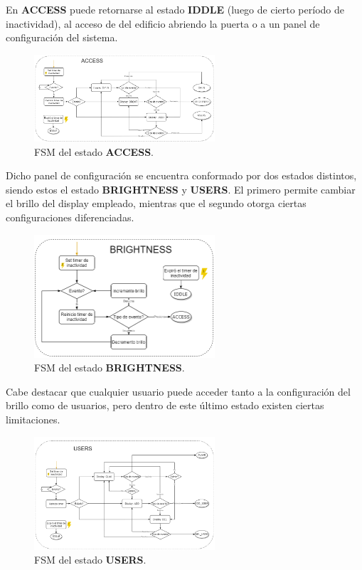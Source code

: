 En \textbf{ACCESS} puede retornarse al estado \textbf{IDDLE} (luego de cierto período de inactividad), al acceso de del edificio abriendo la puerta o a un panel de configuración del sistema.

\begin{figure}[H]
\centering
	\includegraphics[width=0.6\textwidth]{ImagenesEjercicio2/access.png}
	\caption{FSM del estado \textbf{ACCESS}.}
	\label{fig:access}
\end{figure}

Dicho panel de configuración se encuentra conformado por dos estados distintos, siendo estos el estado \textbf{BRIGHTNESS} y \textbf{USERS}. El primero permite cambiar el brillo del display empleado, mientras que el segundo otorga ciertas configuraciones diferenciadas.

\begin{figure}[H]
\centering
	\includegraphics[width=0.6\textwidth]{ImagenesEjercicio2/bright.png}
	\caption{FSM del estado \textbf{BRIGHTNESS}.}
	\label{fig:bright}
\end{figure}

Cabe destacar que cualquier usuario puede acceder tanto a la configuración del brillo como de usuarios, pero dentro de este último estado existen ciertas limitaciones.

\begin{figure}[H]
\centering
	\includegraphics[width=0.6\textwidth]{ImagenesEjercicio2/users.png}
	\caption{FSM del estado \textbf{USERS}.}
	\label{fig:users}
\end{figure}

